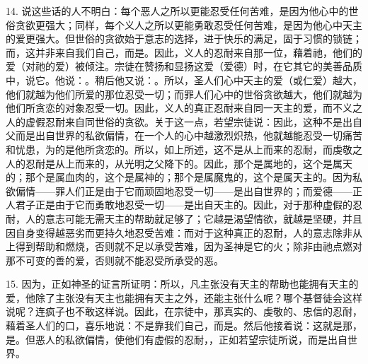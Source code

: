 14. 说这些话的人不明白：每个恶人之所以更能忍受任何苦难，是因为他心中的世俗贪欲更强大；同样，每个义人之所以更能勇敢忍受任何苦难，是因为他心中天主的爱更强大。但世俗的贪欲始于意志的选择，进于快乐的满足，固于习惯的锁链；而，这并非来自我们自己，而是。因此，义人的忍耐来自那一位，藉着祂，他们的爱（对祂的爱）被倾注。宗徒在赞扬和显扬这爱（爱德）时，在它其它的美善品质中，说它。他说：。稍后他又说：。所以，圣人们心中天主的爱（或仁爱）越大，他们就越为他们所爱的那位忍受一切；而罪人们心中的世俗贪欲越大，他们就越为他们所贪恋的对象忍受一切。因此，义人的真正忍耐来自同一天主的爱，而不义之人的虚假忍耐来自同世俗的贪欲。关于这一点，若望宗徒说：因此，这种不是出自父而是出自世界的私欲偏情，在一个人的心中越激烈炽热，他就越能忍受一切痛苦和忧患，为的是他所贪恋的。所以，如上所述，这不是从上而来的忍耐，而虔敬之人的忍耐是从上而来的，从光明之父降下的。因此，那个是属地的，这个是属天的；那个是属血肉的，这个是属神的；那个是属魔鬼的，这个是属天主的。因为私欲偏情——罪人们正是由于它而顽固地忍受一切——是出自世界的；而爱德——正人君子正是由于它而勇敢地忍受一切——是出自天主的。因此，对于那种虚假的忍耐，人的意志可能无需天主的帮助就足够了；它越是渴望情欲，就越是坚硬，并且因自身变得越恶劣而更持久地忍受苦难：而对于这种真正的忍耐，人的意志除非从上得到帮助和燃烧，否则就不足以承受苦难，因为圣神是它的火；除非由祂点燃对那不可变的善的爱，否则就不能忍受所承受的恶。\par

15. 因为，正如神圣的证言所证明：所以，凡主张没有天主的帮助也能拥有天主的爱，他除了主张没有天主也能拥有天主之外，还能主张什么呢？哪个基督徒会这样说呢？连疯子也不敢这样说。因此，在宗徒中，那真实的、虔敬的、忠信的忍耐，藉着圣人们的口，喜乐地说：不是靠我们自己，而是。然后他接着说：这就是那，是。但恶人的私欲偏情，使他们有虚假的忍耐，，正如若望宗徒所说，而是出自世界。\par

